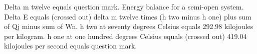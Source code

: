 Delta m twelve equals question mark.
Energy balance for a semi-open system.
Delta E equals (crossed out) delta m twelve times (h two minus h one) plus sum of Qj minus sum of Wn.
h two at seventy degrees Celsius equals 292.98 kilojoules per kilogram.
h one at one hundred degrees Celsius equals (crossed out) 419.04 kilojoules per second equals question mark.